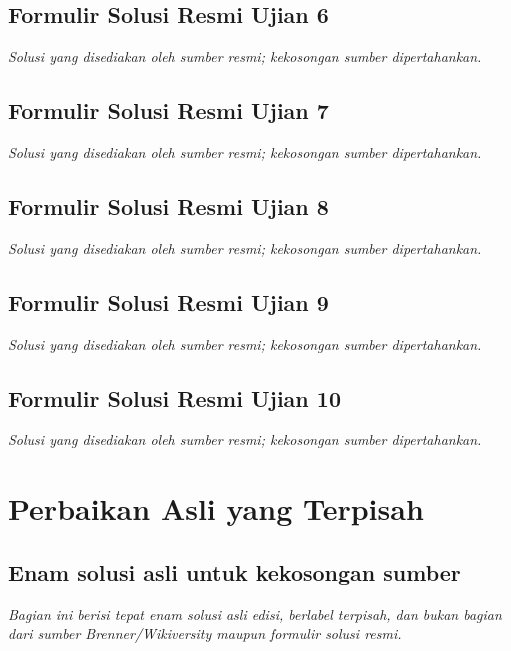 \documentclass[11pt,a4paper,oneside]{book}
\begin{document}
\chapter{Formulir Solusi Resmi Ujian 6}
\noindent\textit{Solusi yang disediakan oleh sumber resmi; kekosongan sumber dipertahankan.}
\begingroup
\renewcommand{\theHfakt}{o011.exam.official.06.\arabic{fakt}}

\endgroup

\chapter{Formulir Solusi Resmi Ujian 7}
\noindent\textit{Solusi yang disediakan oleh sumber resmi; kekosongan sumber dipertahankan.}
\begingroup
\renewcommand{\theHfakt}{o011.exam.official.07.\arabic{fakt}}

\endgroup

\chapter{Formulir Solusi Resmi Ujian 8}
\noindent\textit{Solusi yang disediakan oleh sumber resmi; kekosongan sumber dipertahankan.}
\begingroup
\renewcommand{\theHfakt}{o011.exam.official.08.\arabic{fakt}}

\endgroup

\chapter{Formulir Solusi Resmi Ujian 9}
\noindent\textit{Solusi yang disediakan oleh sumber resmi; kekosongan sumber dipertahankan.}
\begingroup
\renewcommand{\theHfakt}{o011.exam.official.09.\arabic{fakt}}

\endgroup

\chapter{Formulir Solusi Resmi Ujian 10}
\noindent\textit{Solusi yang disediakan oleh sumber resmi; kekosongan sumber dipertahankan.}
\begingroup
\renewcommand{\theHfakt}{o011.exam.official.10.\arabic{fakt}}

\endgroup

\part{Perbaikan Asli yang Terpisah}
\chapter{Enam solusi asli untuk kekosongan sumber}
\noindent\textit{Bagian ini berisi tepat enam solusi asli edisi, berlabel terpisah, dan bukan bagian dari sumber Brenner/Wikiversity maupun formulir solusi resmi.}

\end{document}
